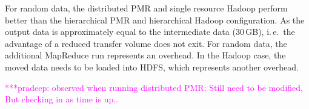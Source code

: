 \documentclass{acm_proc_article-sp}
\newcommand{\pnote}[1]{ {\textcolor{magenta} { ***pradeep: #1 }}}
\newcommand{\pnote}[1]{}
\begin{document}

For random data, the distributed PMR and single resource Hadoop
perform better than the hierarchical PMR and hierarchical Hadoop
configuration. As the output data is approximately equal to the
intermediate data (30\,GB), i.\,e.\ the advantage of a reduced
transfer volume does not exit. For random data, the additional
MapReduce run represents an overhead. In the Hadoop case, the moved
data needs to be loaded into HDFS, which represents another overhead.






\pnote{observed when running distributed PMR; Still need to be modified, But 
checking in as time is up..}
\end{document}
